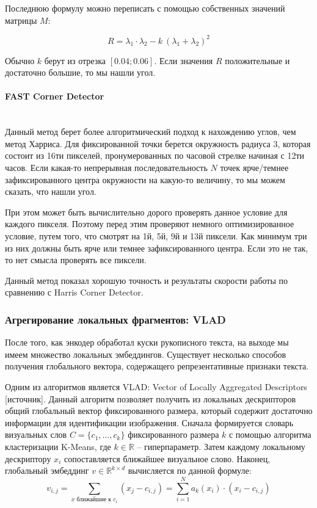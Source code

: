     Последнюю формулу можно переписать с помощью собственных значений матрицы $M$:

    $$
        R = \lambda_1 \cdot \lambda_2 - k \: (\lambda_1 + \lambda_2)^2
    $$
    \noindent

    Обычно $k$ берут из отрезка $[0.04; 0.06]$. Если значения $R$ положительные и достаточно большие, то мы нашли угол. 

    \paragraph{FAST Corner Detector}\mbox{} \\
    Данный метод берет более алгоритмический подход к нахождению углов, чем метод Харриса. Для фиксированной точки берется окружность радиуса 3, которая состоит из 16ти пикселей, пронумерованных по часовой стрелке начиная с 12ти часов. Если какая-то непрерывная последовательность $N$ точек ярче/темнее зафиксированного центра окружности на какую-то величину, то мы можем сказать, что нашли угол. 

    При этом может быть вычислительно дорого проверять данное условие для каждого пикселя. Поэтому перед этим проверяют немного оптимизированное условие, путем того, что смотрят на 1й, 5й, 9й и 13й пиксели. Как минимум три из них должны быть ярче или темнее зафиксированного центра. Если это не так, то нет смысла проверять все пиксели.

    Данный метод показал хорошую точность и результаты скорости работы по сравнению с Harris Corner Detector.

\subsubsection{Агрегирование локальных фрагментов: VLAD}

    После того, как энкодер обработал куски рукописного текста, на выходе мы имеем множество локальных эмбеддингов. Существует несколько способов получения глобального вектора, содержащего репрезентативные признаки текста. 

    Одним из алгоритмов является VLAD: Vector of Locally Aggregated Descriptors [источник]. Данный алгоритм позволяет получить из локальных дескрипторов общий глобальный вектор фиксированного размера, который содержит достаточно информации для идентификации изображения. Сначала формируется словарь визуальных слов $C = \{ c_1, \dots, c_k \}$ фиксированного размера $k$ с помощью алгоритма кластеризации K-Means, где $k \in \mathbb{R}$ -- гиперпараметр. Затем каждому локальному дескриптору $x_i$ сопоставляется ближайшее визуальное слово. Наконец, глобальный эмбеддинг $v \in \mathbb{R}^{k \times d}$ вычисляется по данной формуле:
    $$
        v_{i, j} = \sum_{x \text{ ближайшие к } c_i} (x_j - c_{i, j}) = \sum_{i = 1}^N a_k(x_i) \cdot (x_i - c_{i, j})
    $$

